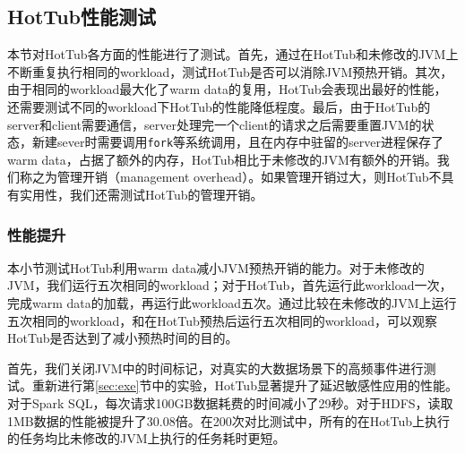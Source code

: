 \documentclass[lang=cn,12pt,a4paper,cite=authoryear]{elegantpaper}
\begin{document}
\subsection{HotTub性能测试}
本节对HotTub各方面的性能进行了测试。首先，通过在HotTub和未修改的JVM上不断重复执行相同的workload，测试HotTub是否可以消除JVM预热开销。其次，由于相同的workload最大化了warm data的复用，HotTub会表现出最好的性能，还需要测试不同的workload下HotTub的性能降低程度。最后，由于HotTub的server和client需要通信，server处理完一个client的请求之后需要重置JVM的状态，新建sever时需要调用\texttt{fork}等系统调用，且在内存中驻留的server进程保存了warm data，占据了额外的内存，HotTub相比于未修改的JVM有额外的开销。我们称之为管理开销（management overhead）。如果管理开销过大，则HotTub不具有实用性，我们还需测试HotTub的管理开销。

\subsubsection{性能提升}
本小节测试HotTub利用warm data减小JVM预热开销的能力。对于未修改的JVM，我们运行五次相同的workload；对于HotTub，首先运行此workload一次，完成warm data的加载，再运行此workload五次。通过比较在未修改的JVM上运行五次相同的workload，和在HotTub预热后运行五次相同的workload，可以观察HotTub是否达到了减小预热时间的目的。

首先，我们关闭JVM中的时间标记，对真实的大数据场景下的高频事件进行测试。重新进行第\ref{sec:exe}节中的实验，HotTub显著提升了延迟敏感性应用的性能。对于Spark SQL，每次请求100GB数据耗费的时间减小了29秒。对于HDFS，读取1MB数据的性能被提升了30.08倍。在200次对比测试中，所有的在HotTub上执行的任务均比未修改的JVM上执行的任务耗时更短。
\end{document}
